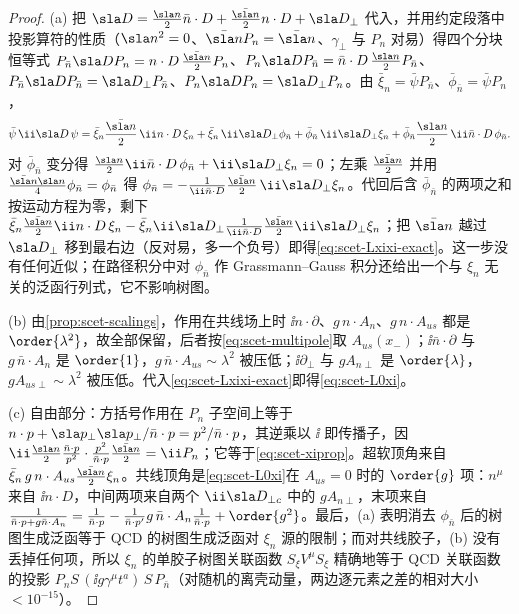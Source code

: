 \begin{proof}
(a) 把 $\sla D=\frac{\sla n}{2}\bar n\cdot D+\frac{\bar{\sla n}}{2}n\cdot D+\sla D_\perp$ 代入，并用约定段落中投影算符的性质（$\sla n^2=0$、$\bar{\sla n}P_n=\bar{\sla n}$、$\gamma_\perp$ 与 $P_n$ 对易）得四个分块恒等式
$P_{\bar n}\sla DP_n=n\cdot D\,\frac{\bar{\sla n}}{2}P_n$、$P_n\sla DP_{\bar n}=\bar n\cdot D\,\frac{\sla n}{2}P_{\bar n}$、$P_{\bar n}\sla DP_{\bar n}=\sla D_\perp P_{\bar n}$、$P_n\sla DP_n=\sla D_\perp P_n$。由 $\bar\xi_n=\bar\psi P_{\bar n}$、$\bar\phi_{\bar n}=\bar\psi P_n$，
\begin{equation}\label{eq:scet-psiDpsi}
\bar\psi\,\ii\sla D\,\psi=\bar\xi_n\frac{\bar{\sla n}}{2}\,\ii n\cdot D\,\xi_n+\bar\xi_n\,\ii\sla D_\perp\phi_{\bar n}
+\bar\phi_{\bar n}\,\ii\sla D_\perp\xi_n+\bar\phi_{\bar n}\frac{\sla n}{2}\,\ii\bar n\cdot D\,\phi_{\bar n}.
\end{equation}
对 $\bar\phi_{\bar n}$ 变分得 $\frac{\sla n}{2}\ii\bar n\cdot D\,\phi_{\bar n}+\ii\sla D_\perp\xi_n=0$；左乘 $\frac{\bar{\sla n}}{2}$ 并用 $\frac{\bar{\sla n}\sla n}{4}\phi_{\bar n}=\phi_{\bar n}$ 得 $\phi_{\bar n}=-\frac{1}{\ii\bar n\cdot D}\frac{\bar{\sla n}}{2}\,\ii\sla D_\perp\xi_n$。代回后含 $\bar\phi_{\bar n}$ 的两项之和按运动方程为零，剩下 $\bar\xi_n\frac{\bar{\sla n}}2\ii n\cdot D\,\xi_n-\bar\xi_n\ii\sla D_\perp\frac{1}{\ii\bar n\cdot D}\frac{\bar{\sla n}}{2}\ii\sla D_\perp\xi_n$；把 $\bar{\sla n}$ 越过 $\sla D_\perp$ 移到最右边（反对易，多一个负号）即得\cref{eq:scet-Lxixi-exact}。这一步没有任何近似；在路径积分中对 $\phi_{\bar n}$ 作 Grassmann--Gauss 积分还给出一个与 $\xi_n$ 无关的泛函行列式，它不影响树图。

(b) 由\cref{prop:scet-scalings}，作用在共线场上时 $\ii n\cdot\partial$、$g\,n\cdot A_n$、$g\,n\cdot A_{us}$ 都是 $\order{\lambda^2}$，故全部保留，后者按\cref{eq:scet-multipole}取 $A_{us}(x_-)$；$\ii\bar n\cdot\partial$ 与 $g\,\bar n\cdot A_n$ 是 $\order{1}$，$g\,\bar n\cdot A_{us}\sim\lambda^2$ 被压低；$\ii\partial_\perp$ 与 $gA_{n\perp}$ 是 $\order{\lambda}$，$gA_{us\perp}\sim\lambda^2$ 被压低。代入\cref{eq:scet-Lxixi-exact}即得\cref{eq:scet-L0xi}。

(c) 自由部分：方括号作用在 $P_n$ 子空间上等于 $n\cdot p+\sla p_\perp\sla p_\perp/\bar n\cdot p=p^2/\bar n\cdot p$，其逆乘以 $\ii$ 即传播子，因 $\ii\frac{\sla n}{2}\frac{\bar n\cdot p}{p^2}\cdot\frac{p^2}{\bar n\cdot p}\frac{\bar{\sla n}}{2}=\ii P_n$；它等于\cref{eq:scet-xiprop}。超软顶角来自 $\bar\xi_n\,g\,n\cdot A_{us}\frac{\bar{\sla n}}2\xi_n$。共线顶角是\cref{eq:scet-L0xi}在 $A_{us}=0$ 时的 $\order{g}$ 项：$n^\mu$ 来自 $\ii n\cdot D$，中间两项来自两个 $\ii\sla D_{\perp c}$ 中的 $gA_{n\perp}$，末项来自 $\frac{1}{\bar n\cdot p+g\bar n\cdot A_n}=\frac{1}{\bar n\cdot p}-\frac{1}{\bar n\cdot p'}g\,\bar n\cdot A_n\frac{1}{\bar n\cdot p}+\order{g^2}$。最后，(a) 表明消去 $\phi_{\bar n}$ 后的树图生成泛函等于 QCD 的树图生成泛函对 $\xi_n$ 源的限制；而对共线胶子，(b) 没有丢掉任何项，所以 $\xi_n$ 的单胶子树图关联函数 $S_\xi V^\mu S_\xi$ 精确地等于 QCD 关联函数的投影 $P_n S\,(\ii g\gamma^\mu t^a)\,S\,P_{\bar n}$（对随机的离壳动量，两边逐元素之差的相对大小 $<10^{-15}$）。%
\end{proof}

